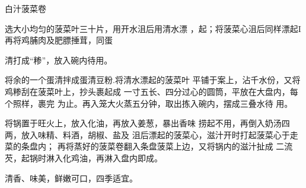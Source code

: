 \begin{recipe}{白汁菠菜卷}

\ingredients


\cooking

\step 选大小均匀的菠菜叶三十片，用开水沮后用清水漂 ，起；将菠菜心沮后同样漂起I再将鸡脯肉及肥膘捶茸，同蛋

清打成“糁”，放入碗内待用。

\step 	将余的一个蛋清拌成蛋清豆粉.将清水漂起的菠菜叶 平铺于案上，沾千水份，又将鸡糁刮在菠菜叶上，抄头裹起成 一寸五长、四分过心的圆筒，平放在大盘内，每个照样，裹完 为止。再入笼大火蒸五分钟，取出拣入碗内，摆成三叠水待 用。

\step 	将锅置于旺火上，放入化油，再放入姜葱，暴出香味 捞起不用，再倒入奶汤四两，放入味精、料酒，胡椒、盐及 沮后漂起的菠菜心，滋汁开时打起菠菜心于走菜的条盘内； 再将蒸好的菠菜卷翻入条盘菠菜上边，又将锅内的滋汁扯成 二流芡，起锅时淋入化鸡油，再淋入盘内即成。

\notes

清香、味美，鲜嫩可口，四季适宜。

\end{recipe}

